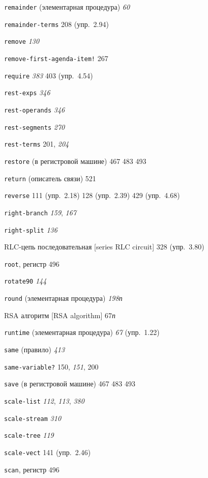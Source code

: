 \begin{theindex}
\item {\texttt{remainder} (элементарная процедура)} {\it 60}
\item {\texttt{remainder-terms}} 208 (упр.~2.94)
\item {\texttt{remove}} {\it 130}
\item {\texttt{remove-first-agenda-item!}} 267
\item {\texttt{require}} {\it 383}
   403 (упр.~4.54)
\item {\texttt{rest-exps}} {\it 346}
\item {\texttt{rest-operands}} {\it 346}
\item {\texttt{rest-segments}} {\it 270}
\item {\texttt{rest-terms}} 201, {\it 204}
\item {\texttt{restore} (в регистровой машине)} 467
   483
   493
\item {\texttt{return} (описатель связи)} 521
\item {\texttt{reverse}} 111 (упр.~2.18)
   128 (упр.~2.39)
   429 (упр.~4.68)
\item {\texttt{right-branch}} {\it 159}, {\it 167}
\item {\texttt{right-split}} {\it 136}
\item {RLC-цепь последовательная [series RLC circuit]} 328 (упр.~3.80)
\item {\texttt{root}, регистр} 496
\item {\texttt{rotate90}} {\it 144}
\item {\texttt{round} (элементарная процедура)} {\it 198}{\it п}
\item {RSA алгоритм [RSA algorithm]} 67{\it п}
\item {\texttt{runtime} (элементарная процедура)} {\it 67} (упр.~1.22)
\bigskip
\item {\texttt{same} (правило)} {\it 413}
\item {\texttt{same-variable?}} 150, {\it 151}, 200
\item {\texttt{save} (в регистровой машине)} 467
   483
   493
\item {\texttt{scale-list}} {\it 112}, {\it 113}, {\it 380}
\item {\texttt{scale-stream}} {\it 310}
\item {\texttt{scale-tree}} {\it 119}
\item {\texttt{scale-vect}} 141 (упр.~2.46)
\item {\texttt{scan}, регистр} 496

\end{theindex}
